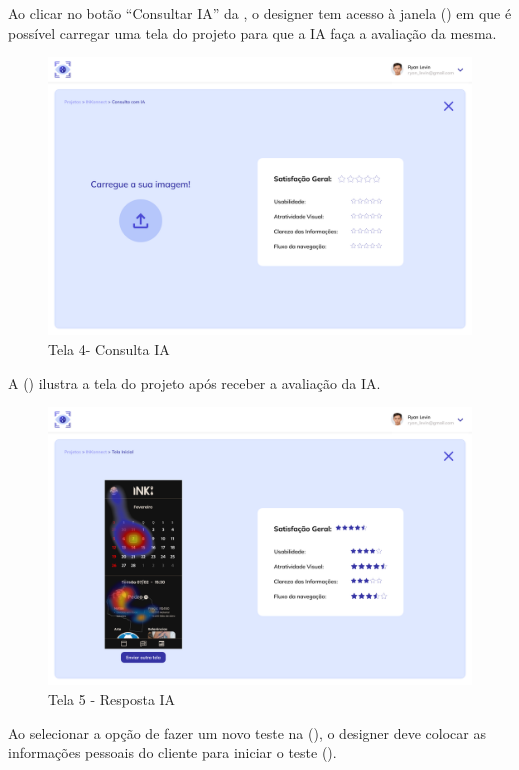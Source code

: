 Ao clicar no botão “Consultar IA” da , o designer tem acesso à janela () em que é possível carregar uma tela do projeto para que a IA faça a avaliação da mesma.

\begin{figure}[H]
    \centering
    \caption{Tela 4- Consulta IA}%
    \label{fig:pg-tela4}
    \includegraphics[width=0.72\linewidth]{Illustrations/tela4.png}
\end{figure}

A () ilustra a tela do projeto após receber a avaliação da IA.

\begin{figure}[H]
    \centering
    \caption{Tela 5 - Resposta IA}%
    \label{fig:pg-tela5}
    \includegraphics[width=0.72\linewidth]{Illustrations/tela5.png}
\end{figure}

Ao selecionar a opção de fazer um novo teste na (), o designer deve colocar as informações pessoais do cliente para iniciar o teste ().

